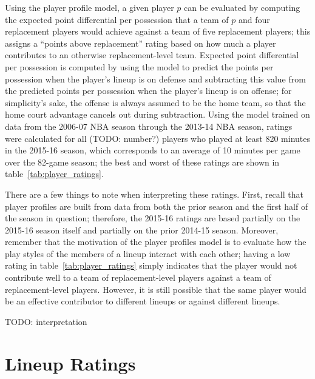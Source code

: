 Using the player profile model, a given player $p$ can be evaluated by computing the
expected point differential per possession that a team of $p$ and four replacement
players would achieve against a team of five replacement players; this assigns a
``points above replacement'' rating based on how much a player contributes to an
otherwise replacement-level team. Expected point differential per possession is
computed by using the model to predict the points per possession when the player's
lineup is on defense and subtracting this value from the predicted points per
possession when the player's lineup is on offense; for simplicity's sake, the
offense is always assumed to be the home team, so that the home court advantage
cancels out during subtraction. Using the model trained on data from the 2006-07 NBA
season through the 2013-14 NBA season, ratings were calculated for all (TODO:
number?) players who played at least 820 minutes in the 2015-16 season, which
corresponds to an average of 10 minutes per game over the 82-game season; the best
and worst of these ratings are shown in table~\ref{tab:player_ratings}.

\begin{table}
    \centering
    \noindent{}
    \caption{TODO}
    \label{tab:player_ratings}
\end{table}

There are a few things to note when interpreting these ratings. First, recall that
player profiles are built from data from both the prior season and the first half of
the season in question; therefore, the 2015-16 ratings are based partially on the
2015-16 season itself and partially on the prior 2014-15 season.  Moreover, remember
that the motivation of the player profiles model is to evaluate how the play styles
of the members of a lineup interact with each other; having a low rating in
table~\ref{tab:player_ratings} simply indicates that the player would not contribute
well to a team of replacement-level players against a team of replacement-level
players.  However, it is still possible that the same player would be an effective
contributor to different lineups or against different lineups.

TODO: interpretation

\section{Lineup Ratings}

